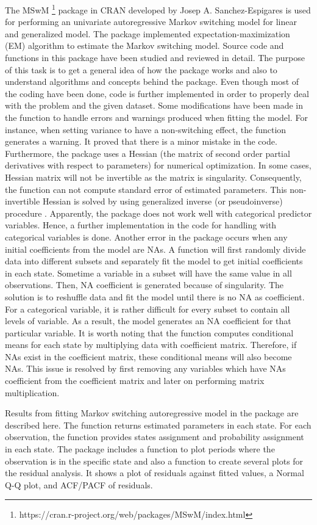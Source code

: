 \documentclass[]{article}
\begin{document}
The MSwM \footnote{https://cran.r-project.org/web/packages/MSwM/index.html} package in CRAN developed by Josep A. Sanchez-Espigares is used for performing an univariate autoregressive Markov switching model for linear and generalized model. The package implemented expectation-maximization (EM) algorithm to estimate the Markov switching model. Source code and functions in this package have been studied and reviewed in detail. The purpose of this task is to get a general idea of how the package works and also to understand algorithms and concepts behind the package. Even though most of the coding have been done, code is further implemented in order to properly deal with the problem and the given dataset. Some modifications have been made in the function to handle errors and warnings produced when fitting the model. For instance, when setting variance to have a non-switching effect, the function generates a warning. It proved that there is a minor mistake in the code. Furthermore, the package uses a Hessian (the matrix of second order partial derivatives with respect to parameters) for numerical optimization. In some cases, Hessian matrix will not be invertible as the matrix is singularity. Consequently, the function can not compute standard error of estimated parameters. This non-invertible Hessian is solved by using generalized inverse (or pseudoinverse) procedure \cite{gill2004your}. Apparently, the package does not work well with categorical predictor variables. Hence, a further implementation in the code for handling with categorical variables is done. Another error in the package occurs when any initial coefficients from the model are NAs. A function will first randomly divide data into different subsets and separately fit the model to get initial coefficients in each state. Sometime a variable in a subset will have the same value in all observations. Then, NA coefficient is generated because of singularity. The solution is to reshuffle data and fit the model until there is no NA as coefficient. For a categorical variable, it is rather difficult for every subset to contain all levels of variable. As a result, the model generates an NA coefficient for that particular variable. It is worth noting that the function computes conditional means for each state by multiplying data with coefficient matrix. Therefore, if NAs exist in the coefficient matrix, these conditional means will also become NAs. This issue is resolved by first removing any variables which have NAs coefficient from the coefficient matrix and later on performing matrix multiplication. 

Results from fitting Markov switching autoregressive model in the package are described here. The function returns estimated parameters in each state. For each observation, the function provides states assignment and probability assignment in each state. The package includes a function to plot periods where the observation is in the specific state and also a function to create several plots for the residual analysis. It shows a plot of residuals against fitted values, a Normal Q-Q plot, and ACF/PACF of residuals.



\end{document}
